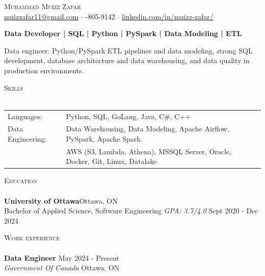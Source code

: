 \documentclass[a4paper]{article}
\newcommand{\lineunder} {
    \vspace*{-8pt} \\
    \hspace*{-18pt} \hrulefill \\
}
\newcommand{\header} [1] {
    {\hspace*{-18pt}\vspace*{6pt} \textsc{#1}}
    \vspace*{-6pt} \lineunder
}
\begin{document}
\vspace*{-40pt}
\vspace*{-10pt}
\begin{center}
	{\Huge \scshape {Muhammad Muizz Zafar}}\\
	\faSend \space \href{mailto:muizzafar11@gmail.com}{muizzafar11@gmail.com} $\cdot$ \faPhoneSquare {}-805-9142 $\cdot$ \faLinkedinSquare \space \href{https://www.linkedin.com/in/muizz-zafar/}{linkedin.com/in/muizz-zafar/}
	\\
\end{center}
\vspace{-5pt}
\begin{center}
\textbf{Data Developer | SQL | Python | PySpark | Data Modeling | ETL}
\end{center}
\begin{center}
Data engineer: Python/PySpark ETL pipelines and data modeling, strong SQL development, database architecture and data warehousing, and data quality in production environments.
\end{center}
\header{Skills}
\begin{tabular}{ l l }
	Languages: & Python, SQL, GoLang, Java, C\#, C++ \\
Data Engineering: & Data Warehousing, Data Modeling, Apache Airflow, PySpark, Apache Spark\\
& AWS (S3, Lambda, Athena), MSSQL Server, Oracle, Docker, Git, Linux, Datalake
\end{tabular}
\header{Education}
\textbf{University of Ottawa}\hfill Ottawa, ON\\
Bachelor of Applied Science, Software Engineering \textit{GPA: 3.7/4.0} \hfill Sept 2020 - Dec 2024\\
\vspace{1mm}
\header{Work experience}
\vspace{1.5mm}
\textbf{Data Engineer} \hfill May 2024 - Present\\
\textit{Government Of Canada} \hfill Ottawa, ON\\
\vspace{-2mm}
\end{document}
